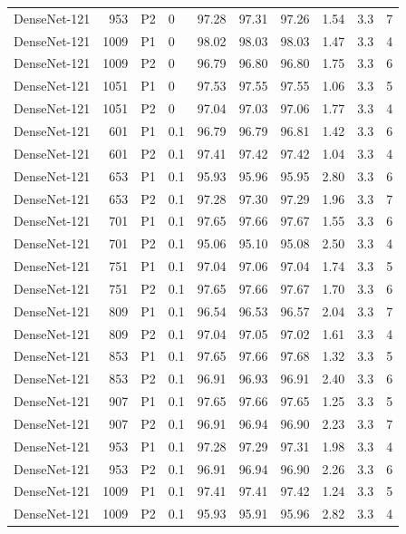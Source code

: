 {\begin{longtable}{lrllrrrrrr}
DenseNet-121 & 953 & P2 & 0 & 97.28 & 97.31 & 97.26 & 1.54 & 3.3 & 7 \\
DenseNet-121 & 1009 & P1 & 0 & 98.02 & 98.03 & 98.03 & 1.47 & 3.3 & 4 \\
DenseNet-121 & 1009 & P2 & 0 & 96.79 & 96.80 & 96.80 & 1.75 & 3.3 & 6 \\
DenseNet-121 & 1051 & P1 & 0 & 97.53 & 97.55 & 97.55 & 1.06 & 3.3 & 5 \\
DenseNet-121 & 1051 & P2 & 0 & 97.04 & 97.03 & 97.06 & 1.77 & 3.3 & 4 \\
DenseNet-121 & 601 & P1 & 0.1 & 96.79 & 96.79 & 96.81 & 1.42 & 3.3 & 6 \\
DenseNet-121 & 601 & P2 & 0.1 & 97.41 & 97.42 & 97.42 & 1.04 & 3.3 & 4 \\
DenseNet-121 & 653 & P1 & 0.1 & 95.93 & 95.96 & 95.95 & 2.80 & 3.3 & 6 \\
DenseNet-121 & 653 & P2 & 0.1 & 97.28 & 97.30 & 97.29 & 1.96 & 3.3 & 7 \\
DenseNet-121 & 701 & P1 & 0.1 & 97.65 & 97.66 & 97.67 & 1.55 & 3.3 & 6 \\
DenseNet-121 & 701 & P2 & 0.1 & 95.06 & 95.10 & 95.08 & 2.50 & 3.3 & 4 \\
DenseNet-121 & 751 & P1 & 0.1 & 97.04 & 97.06 & 97.04 & 1.74 & 3.3 & 5 \\
DenseNet-121 & 751 & P2 & 0.1 & 97.65 & 97.66 & 97.67 & 1.70 & 3.3 & 6 \\
DenseNet-121 & 809 & P1 & 0.1 & 96.54 & 96.53 & 96.57 & 2.04 & 3.3 & 7 \\
DenseNet-121 & 809 & P2 & 0.1 & 97.04 & 97.05 & 97.02 & 1.61 & 3.3 & 4 \\
DenseNet-121 & 853 & P1 & 0.1 & 97.65 & 97.66 & 97.68 & 1.32 & 3.3 & 5 \\
DenseNet-121 & 853 & P2 & 0.1 & 96.91 & 96.93 & 96.91 & 2.40 & 3.3 & 6 \\
DenseNet-121 & 907 & P1 & 0.1 & 97.65 & 97.66 & 97.65 & 1.25 & 3.3 & 5 \\
DenseNet-121 & 907 & P2 & 0.1 & 96.91 & 96.94 & 96.90 & 2.23 & 3.3 & 7 \\
DenseNet-121 & 953 & P1 & 0.1 & 97.28 & 97.29 & 97.31 & 1.98 & 3.3 & 4 \\
DenseNet-121 & 953 & P2 & 0.1 & 96.91 & 96.94 & 96.90 & 2.26 & 3.3 & 6 \\
DenseNet-121 & 1009 & P1 & 0.1 & 97.41 & 97.41 & 97.42 & 1.24 & 3.3 & 5 \\
DenseNet-121 & 1009 & P2 & 0.1 & 95.93 & 95.91 & 95.96 & 2.82 & 3.3 & 4 \\

\end{longtable}}
